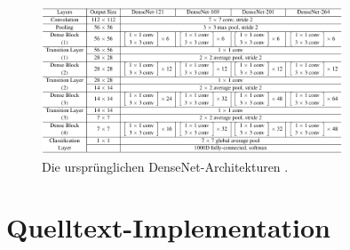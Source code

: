 \begin{figure}
	\centering
	\includegraphics[width=0.8\textwidth]{Bilder/densenet121-architecture.pdf} 
	\caption{Die ursprünglichen DenseNet-Architekturen \cite{Huang.25082016}.}
	\label{fig:densenet121-architecture}
\end{figure} 

\pagebreak

\section{Quelltext-Implementation}







